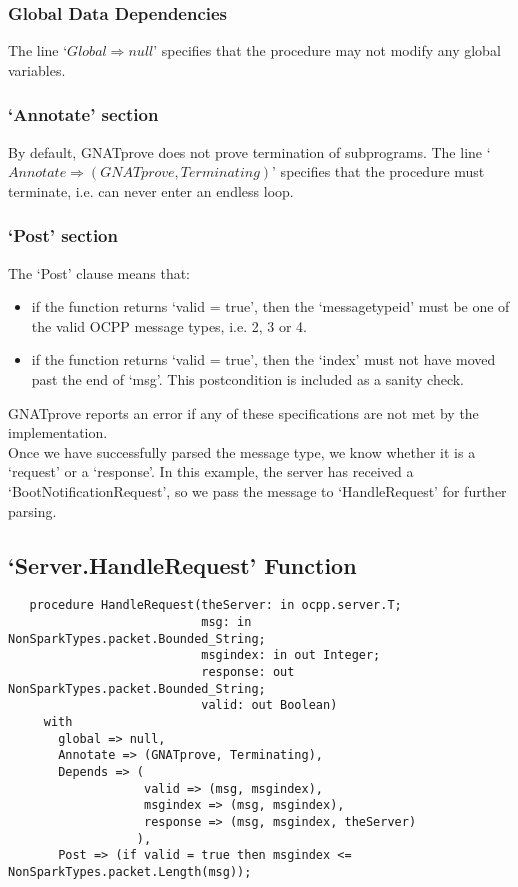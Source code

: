 \documentclass[12pt,openany,a4paper]{book}
\begin{document}
\subsubsection{Global Data Dependencies}
The line `$Global \Rightarrow null$' specifies that the procedure may not modify any global variables. 
\subsubsection{`Annotate' section}
By default, GNATprove does not prove termination of subprograms. The line `$Annotate \Rightarrow (GNATprove, Terminating)$' specifies that the procedure must terminate, i.e. can never enter an endless loop. 
\subsubsection{`Post' section}
The `Post' clause means that:
\begin{itemize}
\item if the function returns `valid = true', then the `messagetypeid' must be one of the valid OCPP message types, i.e. 2, 3 or 4.
\item if the function returns `valid = true', then the `index' must not have moved past the end of `msg'. This postcondition is included as a sanity check. 
\end{itemize}

GNATprove reports an error if any of these specifications are not met by the implementation.\\

Once we have successfully parsed the message type, we know whether it is a `request' or a `response'. In this example, the server has received a `BootNotificationRequest', so we pass the message to `HandleRequest' for further parsing.

\subsection{`Server.HandleRequest' Function}
\begin{verbatim}
   procedure HandleRequest(theServer: in ocpp.server.T;
                           msg: in NonSparkTypes.packet.Bounded_String;
                           msgindex: in out Integer;
                           response: out NonSparkTypes.packet.Bounded_String;
                           valid: out Boolean)
     with
       global => null,
       Annotate => (GNATprove, Terminating),
       Depends => (
                   valid => (msg, msgindex),
                   msgindex => (msg, msgindex),
                   response => (msg, msgindex, theServer)
                  ),
       Post => (if valid = true then msgindex <= NonSparkTypes.packet.Length(msg));
   
\end{verbatim}
\end{document}
